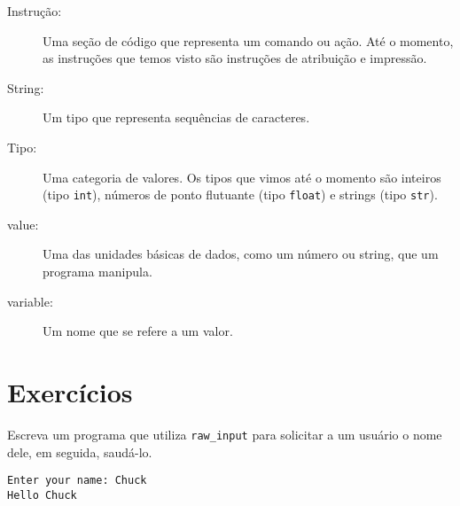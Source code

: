 {{{{{{{{{{{{{{{{{\begin{description}
\item[Instrução:] Uma seção de código que representa um comando ou ação. Até 
o momento, as instruções que temos visto são instruções de atribuição e impressão.

\item[String:] Um tipo que representa sequências de caracteres.

\item[Tipo:] Uma categoria de valores. Os tipos que vimos até o momento 
são inteiros (tipo {\tt int}), números de ponto flutuante (tipo {\tt float}) 
e strings (tipo {\tt str}).

\item[value:] Uma das unidades básicas de dados, como um número ou string,
que um programa manipula.

\item[variable:] Um nome que se refere a um valor.

\end{description}

\section{Exercícios}

\begin{ex}
Escreva um programa que utiliza \verb"raw_input" para solicitar a um usuário o nome dele,
em seguida, saudá-lo.

\begin{verbatim}
Enter your name: Chuck
Hello Chuck
\end{verbatim}


\end{ex}}}}}}}}}}}}}}}}}}
